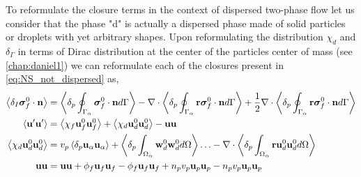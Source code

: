 To reformulate the closure terms in the context of dispersed two-phase flow let us consider that the phase "d" is actually a dispersed phase made of solid particles or droplets with yet arbitrary shapes. 
Upon reformulating the distribution $\chi_d$ and $\delta_\Gamma$ in terms of Dirac distribution at the center of the particles center of mass (see \ref{chap:daniel1}) we can reformulate each of the closures present in \ref{eq:NS_not_dispersed} as, 
\begin{align}
    \left<\delta_I \bm{\sigma}_f^0 \cdot \textbf{n}\right> 
    &= 
    \left<\delta_p \oint_{\Gamma_{\alpha}} \bm{\sigma}_f^0 \cdot \textbf{n} d\Gamma\right> 
    -\mathbf{\nabla}\cdot \left<\delta_p \oint_{\Gamma_{\alpha}} \textbf{r}\bm{\sigma}_f^0 \cdot \textbf{n} d\Gamma\right> 
    + \frac{1}{2}\mathbf{\nabla}\cdot \left<\delta_p \oint_{\Gamma_{\alpha}} \textbf{r}\bm{\sigma}_f^0 \cdot \textbf{n} d\Gamma\right> \\
    \left< \textbf{u}'\textbf{u}'\right>
    &= 
    \left<\chi_f \textbf{u}^0_f\textbf{u}^0_f\right>
    + \left<\chi_d \textbf{u}^0_d\textbf{u}^0_d\right>
    - \textbf{uu}\\
    \left<\chi_d \textbf{u}^0_d\textbf{u}^0_d\right>
    &= 
    v_p\left<\delta_p \textbf{u}_\alpha\textbf{u}_\alpha\right>
    + \left<\delta_p \int_{\Omega_{\alpha}} \textbf{w}_d^0\textbf{w}^0_d d\Omega\right> \ldots
    -\mathbf{\nabla}\cdot \left<\delta_p \int_{\Omega_{\alpha}} \textbf{r}\textbf{u}^0_d\textbf{u}^0_d d\Omega\right>\\
    \textbf{uu} 
    &= 
    \textbf{uu} 
    + \phi_f \textbf{u}_f \textbf{u}_f
    - \phi_f \textbf{u}_f \textbf{u}_f
    + n_pv_p\textbf{u}_p \textbf{u}_p
    - n_pv_p\textbf{u}_p \textbf{u}_p
\end{align}

